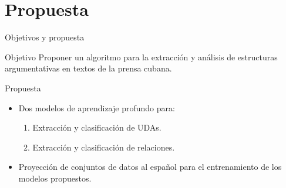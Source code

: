 \documentclass{beamer}
\begin{document}
\section{Propuesta}

\begin{frame}{Objetivos y propuesta}
    \begin{block}{Objetivo}
        \pause
        Proponer un algoritmo para la extracción y
        análisis de estructuras argumentativas en textos de la prensa cubana.
    \end{block}
    \pause
    \begin{block}{Propuesta}
        \pause
        \begin{itemize}
            \item Dos modelos de aprendizaje profundo para:
            \begin{enumerate}
                \pause
                \item Extracción y clasificación de UDAs.
                \pause
                \item Extracción y clasificación de relaciones.
            \end{enumerate}
            \pause
            \item Proyección de conjuntos de datos al español para el entrenamiento de los modelos
            propuestos. 
        \end{itemize}
    \end{block}
\end{frame}
\end{document}
